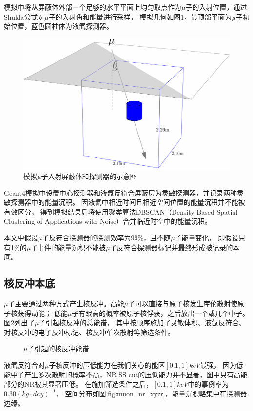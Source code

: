 模拟中将从屏蔽体外部一个足够的水平平面上均匀取点作为$\mu$子的入射位置，通过Shukla公式对$\mu$子的入射角和能量进行采样，
模拟几何如图\ref{fig:muon_inject}，最顶部平面为$\mu$子初始位置，蓝色圆柱体为液氙探测器。

\begin{figure}
  \centering
  \includegraphics[width=0.6\linewidth]{figures/muon_inject.pdf}
  \caption{\label{fig:muon_inject} 模拟$\mu$子入射屏蔽体和探测器的示意图}
\end{figure}

Geant4模拟中设置中心探测器和液氙反符合屏蔽层为灵敏探测器，并记录两种灵敏探测器中的能量沉积。
因液氙中相近时间且相近空间位置的能量沉积并不能被有效区分，
得到模拟结果后将使用聚类算法DBSCAN（Density-Based Spatial Clustering of Applications with Noise）\cite{ester_density-based_1996,schubert_dbscan_2017}合并临近时空中的能量沉积。

本文中假设$\mu$子反符合探测器的探测效率为99\%，且不随$\mu$子能量变化，
即假设只有1\%的$\mu$子事件的能量沉积不能被$\mu$子反符合探测器标记并最终形成被记录的本底。

\subsection{核反冲本底}
\label{sec:muon_nr}

$\mu$子主要通过两种方式产生核反冲。高能$\mu$子可以直接与原子核发生库伦散射使原子核获得动能；
低能$\mu$子有跟高的概率被原子核俘获，之后放出一个或几个中子。图\ref{fig:muon_nr}列出了$\mu$子引起核反冲的总能谱，
其中按顺序施加了灵敏体积、液氙反符合、对核反冲的电子反冲标记、核反冲单次散射等筛选条件。

\begin{figure}
  \centering
  
  \caption{\label{fig:muon_nr} $\mu$子引起的核反冲能谱}
\end{figure}

液氙反符合对$\mu$子核反冲的压低能力在我们关心的能区$[0.1,1]\si{keV}$最强，
因为低能中子产生多次散射的概率不高，NR SS cut的压低能力并不显著，图中只有高能部分的NR被其显著压低。
在施加筛选条件之后，$[0.1,1]\si{keV}$中的事例率为$0.30\left(\si{kg}\cdot\si{day}\right)^{-1}$，
空间分布如图\ref{fig:muon_nr_xyzr}，能量沉积略集中在探测器边缘。

